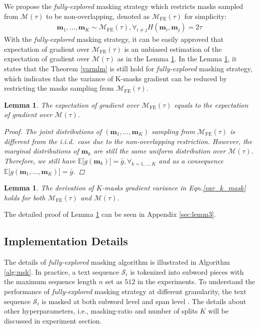 \documentclass{article} \usepackage{iclr2021_conference,times}
\theoremstyle{plain}
\newcommand{\EE}{\mathbb{E}}
\newtheorem{lemma}[theorem]{Lemma}
\begin{document}
We propose the \emph{fully-explored} masking strategy which restricts masks sampled from $\mathcal{M}(\tau)$ to be non-overlapping, denoted as $\mathcal{M}_{\text{FE}}(\tau)$ for simplicity: 
\begin{align}
\label{non_overlap}
    \mathbf{m}_1,\ldots,\mathbf{m}_K \sim \mathcal{M}_{\text{FE}}(\tau), \forall_{i \neq j} H(\mathbf{m}_i, \mathbf{m}_j) = 2 \tau
\end{align}
With the \emph{fully-explored} masking strategy, it can be easily approved that expectation of gradient over $\mathcal{M}_{\text{FE}}(\tau)$ is an unbiased estimation of the expectation of gradient over $\mathcal{M}(\tau)$ as in the Lemma \ref{no_bias_lemma}.  In the Lemma \ref{variance_lemma}, it states that the Theorem \ref{varmlm} is still hold for \emph{fully-explored} masking strategy, which indicates that the variance of K-masks gradient can be reduced by restricting the masks sampling from $\mathcal{M}_{\text{FE}}(\tau)$.
\begin{lemma}
\label{no_bias_lemma}
The expectation of gradient over $\mathcal{M}_{\text{FE}}(\tau)$ equals to the expectation of gradient over $\mathcal{M}(\tau)$.
\begin{proof}
The joint distributions of $(\mathbf{m}_1,\ldots,\mathbf{m}_K)$ sampling from $\mathcal{M}_{\text{FE}}(\tau)$ is different from the i.i.d.\ case due to the non-overlapping restriction. However, the marginal distributions of $\mathbf{m}_k$ are still the same uniform distribution over $\mathcal{M}(\tau)$.
Therefore, we still have $\EE\bigl[g(\mathbf{m}_k)\bigr]=\bar{g}, \forall_{k=1,\ldots,K}$ and as a consequence $\EE\bigl[g(\mathbf{m}_1,\ldots,\mathbf{m}_K)\bigr]=\bar{g}$. 
\end{proof}
\end{lemma}
\begin{lemma}
\label{variance_lemma}
The derivation of $K$-masks gradient variance in Eqn.\ref{var_k_mask} holds for both $\mathcal{M}_{\text{FE}}(\tau)$ and $\mathcal{M}(\tau)$.
\end{lemma}
The detailed proof of Lemma \ref{variance_lemma} can be seen in Appendix \ref{sec:lemm3}.



\vspace{-2mm}
\subsection{Implementation Details}
\vspace{-2mm}
The details of \emph{fully-explored} masking algorithm is illustrated in Algorithm \ref{alg:msk}. In practice, a text sequence $\mathcal{S}_i$ is tokenized into subword pieces \citep{devlin2018bert} with the maximum sequence length $n$ set as $512$ in the experiments. To understand the performance of \emph{fully-explored} masking strategy at different granularity, the text sequence $\mathcal{S}_i$ is masked at both subword level \citep{devlin2018bert,liu2019roberta} and span level \citep{joshi2019spanbert,wang2019structbert}. The details about other hyperparameters, i.e., masking-ratio and number of splits $K$ will be discussed in experiment section.      
 
\end{document}
